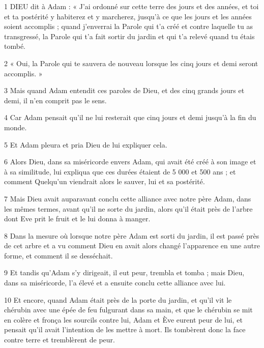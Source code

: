 \par 1 DIEU dit à Adam : « J'ai ordonné sur cette terre des jours et des années, et toi et ta postérité y habiterez et y marcherez, jusqu'à ce que les jours et les années soient accomplis ; quand j'enverrai la Parole qui t'a créé et contre laquelle tu as transgressé, la Parole qui t'a fait sortir du jardin et qui t'a relevé quand tu étais tombé.

\par 2 « Oui, la Parole qui te sauvera de nouveau lorsque les cinq jours et demi seront accomplis. »

\par 3 Mais quand Adam entendit ces paroles de Dieu, et des cinq grands jours et demi, il n'en comprit pas le sens.

\par 4 Car Adam pensait qu'il ne lui resterait que cinq jours et demi jusqu'à la fin du monde.

\par 5 Et Adam pleura et pria Dieu de lui expliquer cela.

\par 6 Alors Dieu, dans sa miséricorde envers Adam, qui avait été créé à son image et à sa similitude, lui expliqua que ces durées étaient de 5 000 et 500 ans ; et comment Quelqu'un viendrait alors le sauver, lui et sa postérité.

\par 7 Mais Dieu avait auparavant conclu cette alliance avec notre père Adam, dans les mêmes termes, avant qu'il ne sorte du jardin, alors qu'il était près de l'arbre dont Eve prit le fruit et le lui donna à manger.

\par 8 Dans la mesure où lorsque notre père Adam est sorti du jardin, il est passé près de cet arbre et a vu comment Dieu en avait alors changé l'apparence en une autre forme, et comment il se desséchait.

\par 9 Et tandis qu'Adam s'y dirigeait, il eut peur, trembla et tomba ; mais Dieu, dans sa miséricorde, l'a élevé et a ensuite conclu cette alliance avec lui.

\par 10 Et encore, quand Adam était près de la porte du jardin, et qu'il vit le chérubin avec une épée de feu fulgurant dans sa main, et que le chérubin se mit en colère et fronça les sourcils contre lui, Adam et Ève eurent peur de lui, et pensait qu'il avait l'intention de les mettre à mort. Ils tombèrent donc la face contre terre et tremblèrent de peur.

